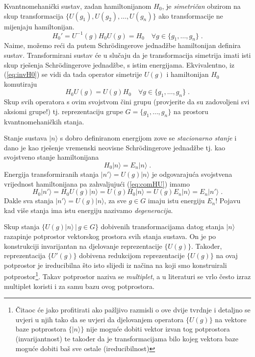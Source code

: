 Kvantnomehanički sustav, zadan
hamiltonijanom $H_0$, je \emph{simetričan} obzirom na skup transformacija
$\{ U(g_1), U(g_2), \ldots, U(g_n)\}$ ako transformacije ne mijenjaju
hamiltonijan. 
\begin{equation}
    H_{0}' = U^{-1}(g) H_{0} U(g) = H_{0} \quad \forall  g \in \{g_1,\ldots, g_n\}\;.
 \label{eq:invH0}
\end{equation}
Naime, možemo reći da putem Schr\"{o}dingerove jednadžbe 
hamiltonijan definira sustav. Transformirani sustav će u slučaju da
je transformacija simetrija imati isti skup rješenja Schr\"{o}dingerove jednadžbe,
s istim energijama.
Ekvivalentno, iz (\ref{eq:invH0}) se vidi da tada operator
simetrije $U(g)$ i hamiltonijan $H_0$ komutiraju
\begin{equation}
  H_{0}U(g)=U(g)H_0 \quad \forall  g \in \{g_1,\ldots, g_n\} \;.
  \label{eq:comHU}
\end{equation}
Skup svih operatora s ovim svojstvom čini grupu (provjerite da su
zadovoljeni svi aksiomi grupe!) tj.
reprezentaciju grupe $G=\{g_1,\ldots, g_n\}$ na prostoru kvantnomehaničkih 
stanja.

Stanje sustava $|n\rangle$ s dobro definiranom energijom  zove se
\emph{stacionarno stanje} i dano je kao rješenje vremenski 
neovisne Schr\"{o}dingerove jednadžbe tj. kao svojstveno stanje hamiltonijana
\begin{displaymath}
  H_0 |n\rangle = E_n | n \rangle \;.
\end{displaymath}
Energija transformiranih stanja $|n'\rangle = U(g)|n\rangle$ je
odgovarajuća svojstvena vrijednost hamiltonijana pa zahvaljujući
(\ref{eq:comHU}) imamo
\begin{displaymath}
  H_0 |n'\rangle = H_0 U(g)|n\rangle = U(g) H_0 |n\rangle =
 U(g) E_n |n\rangle = E_n |n'\rangle \;.
\end{displaymath}
Dakle sva stanja $|n'\rangle = U(g)|n\rangle$, za sve $g\in G$ imaju
istu energiju $E_n$! Pojavu kad više stanja ima istu energiju 
nazivamo \emph{degeneracija}.

Skup stanja $\{U(g)|n \rangle \,|\, g\in G\}$ dobivenih transformacijama
datog stanja $|n\rangle$ razapinje
potprostor vektorskog prostora svih stanja sustava. On je
po konstrukciji invarijantan na djelovanje reprezentacije $\{ U(g) \}$.
Također, reprezentacija $\{ U'(g) \}$ dobivena redukcijom reprezentacije
$\{ U(g) \}$ na ovaj potprostor je ireducibilna što isto slijedi
iz načina na koji smo konstruirali potprostor\footnote{Čitaoc će jako
profitirati ako pažljivo razmisli o ove dvije tvrdnje i detaljno se
uvjeri u njih tako da se uvjeri da djelovanjem operatora $\{ U(g) \}$
na vektore baze potprostora $\{|n \rangle \}$ nije moguće
dobiti vektor izvan tog potprostora (invarijantnost) te također da
je transformacijama bilo kojeg vektora baze moguće dobiti baš sve
ostale (ireducibilnost)}.
Takav potprostor naziva se \emph{multiplet}, a u literaturi se
vrlo često izraz multiplet koristi i za samu bazu ovog potprostora.

